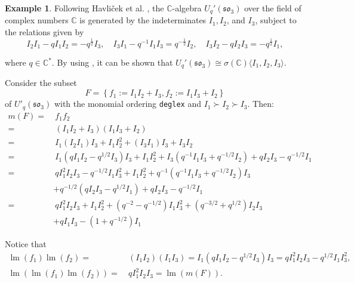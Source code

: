 \documentclass{amsart}
\theoremstyle{definition}
\newtheorem{example}[theorem]{Example}
\theoremstyle{remark}
\numberwithin{equation}{section}
\begin{document}
\begin{example}

Following Havli\v{c}ek et al. \cite[p. 79]{HavlicekKlimykPosta2000}, the $ \mathbb{C}$-algebra $U_q'(\mathfrak{so}_3)$ over the field of complex numbers $\mathbb{C}$ is generated by the indeterminates $I_1, I_2$, and $I_3$, subject to the relations given by
\begin{equation*}
  I_2I_1 - qI_1I_2 = -q^{\frac{1}{2}}I_3,\quad  I_3I_1 - q^{-1}I_1I_3 = q^{-\frac{1}{2}}I_2,\quad     I_3I_2 - qI_2I_3 = -q^{\frac{1}{2}}I_1,
\end{equation*}

where $q\in \mathbb{C}^{*}$. By using \cite[Theorem 1.14]{ReyesSuarezMomento2017}, it can be shown that $U_q'(\mathfrak{so}_3) \cong \sigma(\mathbb{C}) \langle I_1, I_2, I_3\rangle$.

Consider the subset 
$$
F =\left\{f_1:=I_1I_2+I_3, f_2:=I_1I_3+I_2\right\}
$$ 
of $U'_q(\mathfrak{so}_3)$ with the monomial ordering \texttt{deglex} and $I_1\succ I_2\succ I_3$. Then: 
\begin{align*}m(F) = &\ f_1f_2 \\
	= &\ \left(I_1I_2+I_3\right) \left(I_1I_3+I_2\right)\\
	= &\ I_1\left(I_2I_1\right) I_3+I_1I_2^2 + \left(I_3I_1\right) I_3 + I_3I_2\\ = & \ I_1\left(qI_1I_2-q^{1/2}I_3\right) I_3+I_1I_2^2+I_3\left(q^{-1}I_1I_3+q^{-1/2}I_2\right) + qI_2I_3-q^{-1/2}I_1\\= & \ qI_1^2I_2I_3-q^{-1/2}I_1I_3^2+I_1I_2^2+q^{-1} \left(q^{-1}I_1I_3+q^{-1/2}I_2\right) I_3\\ & +q^{-1/2}\left(qI_2I_3-q^{1/2}I_1\right) + qI_2I_3-q^{-1/2}I_1\\ = &\  qI_1^2I_2I_3+I_1I_2^2 + \left(q^{-2}-q^{-1/2}\right) I_1I_3^2 + \left(q^{-3/2}+q^{1/2}\right) I_2I_3\\ & + qI_1I_3 - \left(1+q^{-1/2}\right) I_1	
\end{align*}
 
Notice that 
\begin{align*}
	\operatorname{lm}(f_1)\operatorname{lm}(f_2) = &\ (I_1I_2)(I_1I_3)=I_1(qI_1I_2-q^{1/2}I_3)I_3=qI_1^2I_2I_3-q^{1/2}I_1I_3^2, \\
	\operatorname{lm}\left(\operatorname{lm}\left(f_{ 1}\right) \operatorname{lm}\left(f_{2}\right)\right) = &\ qI_1^2I_2I_3=\operatorname{lm}(m(F)).
\end{align*}
\end{example}
\end{document}
